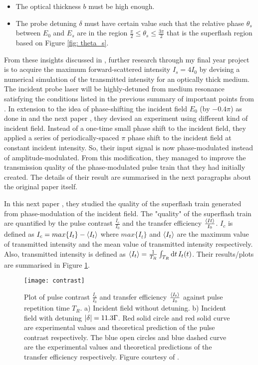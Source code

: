 \begin{itemize}
    \item The optical thickness $b$ must be high enough.
    \item The probe detuning $\delta$ must have certain value such that the relative phase $\theta_{s}$ between $E_{0}$ and $E_{s}$ are in the region $\frac{\pi}{2} \leq \theta_{s} \leq \frac{3\pi}{2}$ that is the superflash region based on Figure \ref{fig: theta_s}.
\end{itemize}

From these insights discussed in \cite{Kwong2014}, further research through my final year project is to acquire the maximum forward-scattered intensity $I_{s} = 4 I_{0}$ by devising a numerical simulation of the transmitted intensity for an optically thick medium. The incident probe laser will be highly-detuned from medium resonance satisfying the conditions listed in the previous summary of important points from \cite{Kwong2014}. In extension to the idea of phase-shifting the incident field $E_{0}$ (by $-0.4\pi$) as done in \cite{Kwong2014} and the next paper \cite{Kwong2015}, they devised an experiment using different kind of incident field. Instead of a one-time small phase shift to the incident field, they applied a series of periodically-spaced $\pi$ phase shift to the incident field at constant incident intensity. So, their input signal is now phase-modulated instead of amplitude-modulated. From this modification, they managed to improve the transmission quality of the phase-modulated pulse train that they had initially created. The details of their result are summarised in the next paragraphs about the original paper \cite{Kwong2015} itself.

In this next paper \cite{Kwong2015}, they studied the quality of the superflash train generated from phase-modulation of the incident field. The "quality" of the superflash train are quantified by the pulse contrast  $\frac{I_{c}}{I_{0}}$ and the transfer efficiency $\frac{\expval{I_{}t}}{I_{0}}$. $I_{c}$ is defined as $I_{c} = max\{I_{t}\} - \expval{I_{t}}$ where $max\{I_{t}\}$ and $\expval{I_{t}}$ are the maximum value of transmitted intensity and the mean value of transmitted intensity respectively. Also, transmitted intensity is defined as $\expval{I_{t}} = \frac{1}{T_{R}} \int_{T_{R}} \dd{t} I_{t}(t)$. Their results/plots are summarised in Figure \ref{fig: contrast}.

\begin{figure}[h!]
    \centering
    \texttt{[image: contrast]}
    \caption{Plot of pulse contrast $\frac{I_{c}}{I_{0}}$ and transfer efficiency $\frac{\expval{I_{t}}}{I_{0}}$ against pulse repetition time $T_{R}$. a) Incident field without detuning. b) Incident field with detuning $\abs{\delta} = 11.3 \Gamma$. Red solid circle and red solid curve are experimental values and theoretical prediction of the pulse contrast respectively. The blue open circles and blue dashed curve are the experimental values and theoretical predictions of the transfer efficiency respectively. Figure courtesy of \cite{Kwong2015}.}
    \label{fig: contrast}
\end{figure}

